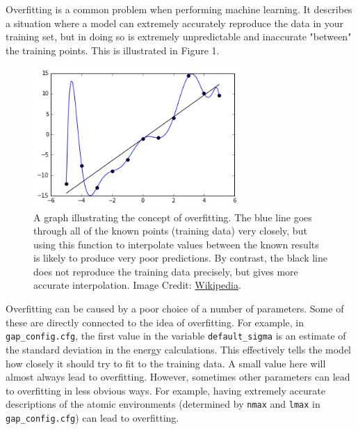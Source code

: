 \documentclass{article}
\begin{document}

Overfitting is a common problem when performing machine learning. It describes a situation where a model can extremely accurately reproduce the data in your training set, but in doing so is extremely unpredictable and inaccurate "between" the training points. This is illustrated in Figure 1.

\begin{figure}[t]

\centering

\includegraphics[width=0.7\textwidth]{Overfitted_Data.png}
\caption{A graph illustrating the concept of overfitting. The blue line goes through all of the known points (training data) very closely, but using this function to interpolate values between the known results is likely to produce very poor predictions. By contrast, the black line does not reproduce the training data precisely, but gives more accurate interpolation. Image Credit: \href{https://en.wikipedia.org/wiki/Overfitting}{Wikipedia}.}

\end{figure}

Overfitting can be caused by a poor choice of a number of parameters. Some of these are directly connected to the idea of overfitting. For example, in \verb|gap_config.cfg|, the first value in the variable \verb|default_sigma| is an estimate of the standard deviation in the energy calculations. This effectively tells the model how closely it should try to fit to the training data. A small value here will almost always lead to overfitting. However, sometimes other parameters can lead to overfitting in less obvious ways. For example, having extremely accurate descriptions of the atomic environments (determined by \verb|nmax| and \verb|lmax| in \verb|gap_config.cfg|) can lead to overfitting.
\end{document}
